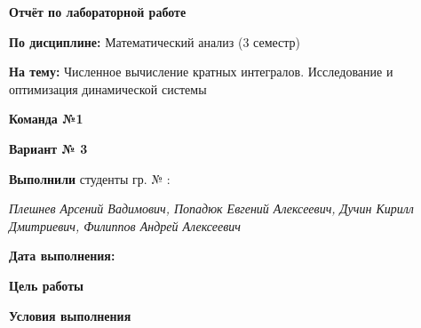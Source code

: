 \begin{titlepage}
{\large\bfseries Отчёт по лабораторной работе\par}
\textbf{По дисциплине:} Математический анализ (3 семестр)

\textbf{На тему:} Численное вычисление кратных интегралов.
Исследование и оптимизация динамической системы
\vspace{1cm}

\textbf{Команда №1}

\textbf{Вариант № 3}

\textbf{Выполнили} студенты гр. № :

\textit{Плешнев Арсений Вадимович, Попадюк Евгений Алексеевич,
Дучин Кирилл Дмитриевич, Филиппов Андрей Алексеевич}

\textbf{Дата выполнения:} 
\vspace{0.7cm}

\textbf{Цель работы}

\vspace{0.5cm}

\textbf{Условия выполнения}

\end{titlepage}
